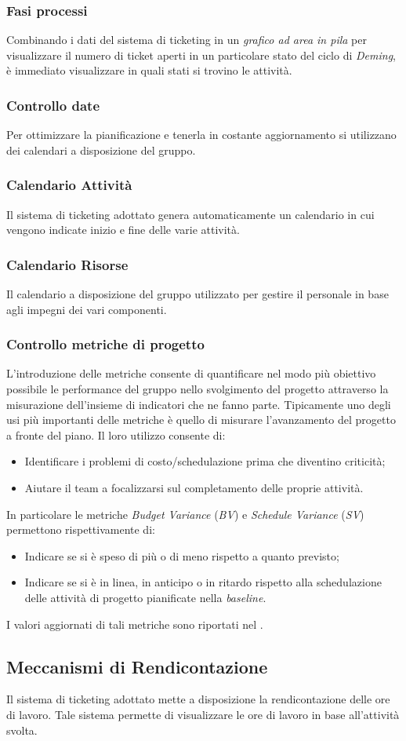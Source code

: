 		\subsubsection{Fasi processi}
		Combinando i dati del sistema di ticketing in un \textit{grafico ad area in pila} per visualizzare il numero di ticket aperti in un particolare stato del ciclo di \textit{Deming}, è immediato visualizzare in quali stati si trovino le attività.
		\subsubsection{Controllo date} Per ottimizzare la pianificazione e tenerla in costante aggiornamento si utilizzano dei calendari a disposizione del gruppo.
		\subsubsection{Calendario Attività}
		Il sistema di ticketing adottato genera automaticamente un calendario in cui vengono indicate inizio e fine delle varie attività.
		\subsubsection{Calendario Risorse} Il calendario a disposizione del gruppo utilizzato per gestire il personale in base agli impegni dei vari componenti.
		\subsubsection{Controllo metriche di progetto} L'introduzione delle metriche consente di quantificare nel modo più obiettivo possibile le performance del gruppo nello svolgimento del progetto attraverso la misurazione dell'insieme di indicatori che ne fanno parte. Tipicamente uno degli usi più importanti delle metriche è quello di misurare l'avanzamento del progetto a fronte del piano. Il loro utilizzo consente di: 
		\begin{itemize}
			\item Identificare i problemi di costo/schedulazione prima che diventino criticità;
			\item Aiutare il team a focalizzarsi sul completamento delle proprie attività.
		\end{itemize}
		In particolare le metriche \textit{Budget Variance} (\textit{BV}) e \textit{Schedule Variance} (\textit{SV}) permettono rispettivamente di:
		\begin{itemize}
			\item Indicare se si è speso di più o di meno rispetto a quanto previsto;
			\item Indicare se si è in linea, in anticipo o in ritardo rispetto alla schedulazione delle	attività di progetto pianificate nella \textit{baseline}. 
		\end{itemize}
		I valori aggiornati di tali metriche sono riportati nel \textit{\PdQ}.
	\subsection{Meccanismi di Rendicontazione} Il sistema di ticketing adottato mette a disposizione la rendicontazione delle ore di lavoro. Tale sistema permette di visualizzare le ore di lavoro in base all'attività svolta.